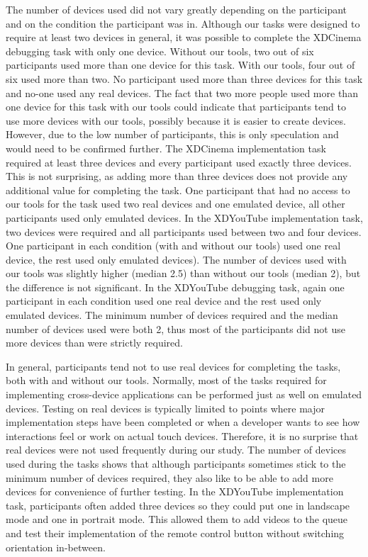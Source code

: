 The number of devices used did not vary greatly depending on the participant and on the condition the participant was in. Although our tasks were designed to require at least two devices in general, it was possible to complete the XDCinema debugging task with only one device. Without our tools, two out of six participants used more than one device for this task. With our tools, four out of six used more than two. No participant used more than three devices for this task and no-one used any real devices. The fact that two more people used more than one device for this task with our tools could indicate that participants tend to use more devices with our tools, possibly because it is easier to create devices. However, due to the low number of participants, this is only speculation and would need to be confirmed further. The XDCinema implementation task required at least three devices and every participant used exactly three devices. This is not surprising, as adding more than three devices does not provide any additional value for completing the task. One participant that had no access to our tools for the task used two real devices and one emulated device, all other participants used only emulated devices. In the XDYouTube implementation task, two devices were required and all participants used between two and four devices. One participant in each condition (with and without our tools) used one real device, the rest used only emulated devices). The number of devices used with our tools was slightly higher (median 2.5) than without our tools (median 2), but the difference is not significant. In the XDYouTube debugging task, again one participant in each condition used one real device and the rest used only emulated devices. The minimum number of devices required and the median number of devices used were both 2, thus most of the participants did not use more devices than were strictly required.

In general, participants tend not to use real devices for completing the tasks, both with and without our tools. Normally, most of the tasks required for implementing cross-device applications can be performed just as well on emulated devices. Testing on real devices is typically limited to points where major implementation steps have been completed or when a developer wants to see how interactions feel or work on actual touch devices. Therefore, it is no surprise that real devices were not used frequently during our study. The number of devices used during the tasks shows that although participants sometimes stick to the minimum number of devices required, they also like to be able to add more devices for convenience of further testing. In the XDYouTube implementation task, participants often added three devices so they could put one in landscape mode and one in portrait mode. This allowed them to add videos to the queue and test their implementation of the remote control button without switching orientation in-between. 


